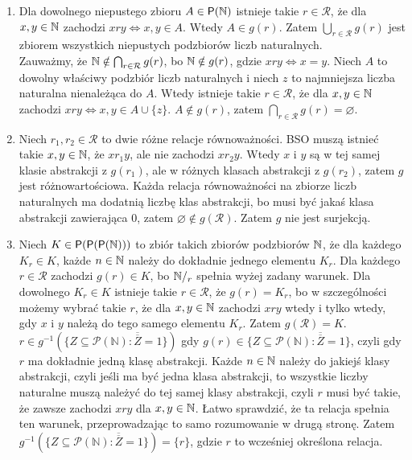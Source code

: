 \documentclass{../note}
\begin{document}
\begin{rozwiazanie}
\begin{enumerate}[label=(\alph*)]
    \item Dla dowolnego niepustego zbioru $A \in \mathsf{P}(\mathbb{N})$ istnieje takie $r \in \mathcal{R}$, że dla $x, y \in \mathbb{N}$ zachodzi $x r y \Leftrightarrow x, y \in A$. Wtedy $A \in g(r)$. Zatem $\bigcup_{r\in\mathcal{R}} g(r)$ jest zbiorem wszystkich niepustych podzbiorów liczb naturalnych.\\
    Zauważmy, że $\mathbb{N} \notin \bigcap_{r\in\mathcal{R}} g(r)$, bo $\mathbb{N} \notin g(r)$, gdzie $xry \Leftrightarrow x=y$. Niech $A$ to dowolny właściwy podzbiór liczb naturalnych i niech $z$ to najmniejsza liczba naturalna nienależąca do $A$. Wtedy istnieje takie $r \in \mathcal{R}$, że dla $x, y \in \mathbb{N}$ zachodzi $x r y \Leftrightarrow x, y \in A \cup \{z\}$. $A \notin g(r)$, zatem $\bigcap_{r\in\mathcal{R}} g(r) = \varnothing$.
    \item Niech $r_1, r_2 \in \mathcal{R}$ to dwie różne relacje równoważności. BSO muszą istnieć takie $x, y \in \mathbb{N}$, że $xr_1y$, ale nie zachodzi $xr_2y$. Wtedy $x$ i $y$ są w tej samej klasie abstrakcji z $g(r_1)$, ale w różnych klasach abstrakcji z $g(r_2)$, zatem $g$ jest różnowartościowa. Każda relacja równoważności na zbiorze liczb naturalnych ma dodatnią liczbę klas abstrakcji, bo musi być jakaś klasa abstrakcji zawierająca 0, zatem $\varnothing \notin g(\mathcal{R})$. Zatem $g$ nie jest surjekcją.
    \item Niech $K \in \mathsf{P}(\mathsf{P}(\mathsf{P}(\mathbb{N})))$ to zbiór takich zbiorów podzbiorów $\mathbb{N}$, że dla każdego $K_r \in K$, każde $n \in \mathbb{N}$ należy do dokładnie jednego elementu $K_r$. Dla każdego $r \in \mathcal{R}$ zachodzi $g(r) \in K$, bo $\mathbb{N}/_r$ spełnia wyżej zadany warunek. Dla dowolnego $K_r \in K$ istnieje takie $r \in \mathcal{R}$, że $g(r) = K_r$, bo w szczególności możemy wybrać takie $r$, że dla $x,y \in \mathbb{N}$ zachodzi $xry$ wtedy i tylko wtedy, gdy $x$ i $y$ należą do tego samego elementu $K_r$. Zatem $g(\mathcal{R}) = K$.\\
    $r \in g^{-1}(\{Z \subseteq \mathcal{P}(\mathbb{N}) : \overline{\overline{Z}} = 1\})$ gdy $g(r) \in \{Z \subseteq \mathcal{P}(\mathbb{N}) : \overline{\overline{Z}} = 1\}$, czyli gdy $r$ ma dokładnie jedną klasę abstrakcji. Każde $n \in \mathbb{N}$ należy do jakiejś klasy abstrakcji, czyli jeśli ma być jedna klasa abstrakcji, to wszystkie liczby naturalne muszą należyć do tej samej klasy abstrakcji, czyli $r$ musi być takie, że zawsze zachodzi $xry$ dla $x, y \in \mathbb{N}$. Łatwo sprawdzić, że ta relacja spełnia ten warunek, przeprowadzając to samo rozumowanie w drugą stronę. Zatem $g^{-1}(\{Z \subseteq \mathcal{P}(\mathbb{N}) : \overline{\overline{Z}} = 1\}) = \{r\}$, gdzie $r$ to wcześniej określona relacja.\\

\end{enumerate}
\end{rozwiazanie}
\end{document}
